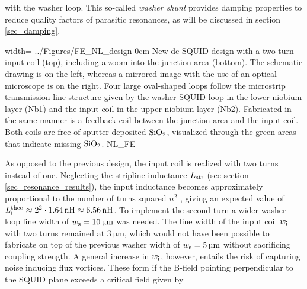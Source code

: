 with the washer loop. This so-called \textit{washer shunt} provides damping properties to reduce quality factors of parasitic resonances, as will be discussed in section \ref{sec_damping}. 

{width=\textwidth}
{../Figures/FE_NL_design}
{0cm}
{New dc-SQUID design with a two-turn input coil (top), including a zoom into the junction area (bottom). The schematic drawing is on the left, whereas a mirrored image with the use of an optical microscope is on the right. Four large oval-shaped loops follow the microstrip transmission line structure given by the washer SQUID loop in the lower niobium layer (Nb1) and the input coil in the upper niobium layer (Nb2). Fabricated in the same manner is a feedback coil between the junction area and the input coil. Both coils are free of sputter-deposited $\rm{SiO_2}$, visualized through the green areas that indicate missing $\rm{SiO_2}$.} 
{NL_FE}

As opposed to the previous design, the input coil is realized with two turns instead of one. Neglecting the stripline inductance $L_{\rm str}$ (see section \ref{sec_resonance_results}), the input inductance becomes approximately proportional to the number of turns squared $n^2$ \cite{Ketchen1981,Jaycox1981}, giving an expected value of $L_{\rm i}^{\rm theo}\approx2^{2}\cdot \qty{1.64}{\nano\henry}\approx\qty{6.56}{\nano\henry}$. To implement the second turn a wider washer loop line width of $w_{\rm s}=\qty{10}{\micro\meter}$ was needed. The line width of the input coil $w_{\rm i}$ with two turns remained at $\qty{3}{\micro\meter}$, which would not have been possible to fabricate on top of the previous washer width of $w_{\rm s}=\qty{5}{\micro\meter}$ without sacrificing coupling strength. A general increase in $w_{\rm i}$, however, entails the risk of capturing noise inducing flux vortices. These form if the B-field pointing perpendicular to the SQUID plane exceeds a critical field given by \cite{Kuit2008} 


